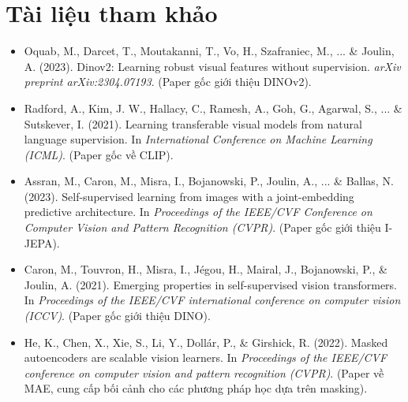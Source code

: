 \section*{Tài liệu tham khảo}
\begin{itemize}
	\item[1] Oquab, M., Darcet, T., Moutakanni, T., Vo, H., Szafraniec, M., ... \& Joulin, A. (2023). Dinov2: Learning robust visual features without supervision. \textit{arXiv preprint arXiv:2304.07193}. (Paper gốc giới thiệu DINOv2).
	\item[2] Radford, A., Kim, J. W., Hallacy, C., Ramesh, A., Goh, G., Agarwal, S., ... \& Sutskever, I. (2021). Learning transferable visual models from natural language supervision. In \textit{International Conference on Machine Learning (ICML)}. (Paper gốc về CLIP).
	\item[3] Assran, M., Caron, M., Misra, I., Bojanowski, P., Joulin, A., ... \& Ballas, N. (2023). Self-supervised learning from images with a joint-embedding predictive architecture. In \textit{Proceedings of the IEEE/CVF Conference on Computer Vision and Pattern Recognition (CVPR)}. (Paper gốc giới thiệu I-JEPA).
	\item[4] Caron, M., Touvron, H., Misra, I., Jégou, H., Mairal, J., Bojanowski, P., \& Joulin, A. (2021). Emerging properties in self-supervised vision transformers. In \textit{Proceedings of the IEEE/CVF international conference on computer vision (ICCV)}. (Paper gốc giới thiệu DINO).
	\item[5] He, K., Chen, X., Xie, S., Li, Y., Dollár, P., \& Girshick, R. (2022). Masked autoencoders are scalable vision learners. In \textit{Proceedings of the IEEE/CVF conference on computer vision and pattern recognition (CVPR)}. (Paper về MAE, cung cấp bối cảnh cho các phương pháp học dựa trên masking).
\end{itemize}